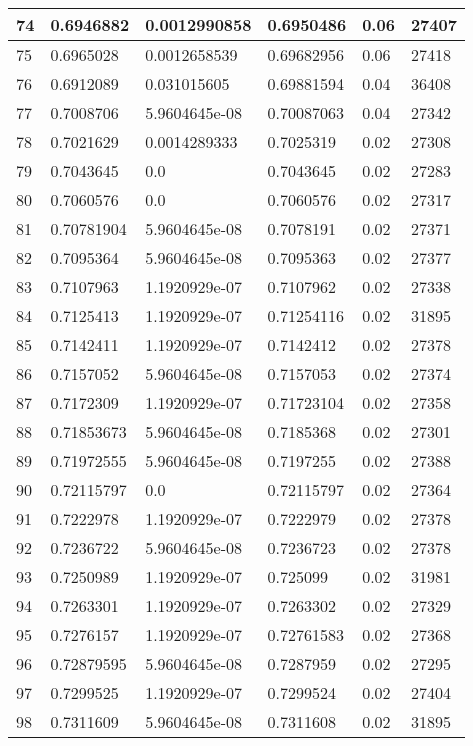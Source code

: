 \begin{longtable}{|l|l|l|l|l|l|}
74 & 0.6946882 & 0.0012990858 & 0.6950486 & 0.06 & 27407 \\ \hline 
75 & 0.6965028 & 0.0012658539 & 0.69682956 & 0.06 & 27418 \\ \hline 
76 & 0.6912089 & 0.031015605 & 0.69881594 & 0.04 & 36408 \\ \hline 
77 & 0.7008706 & 5.9604645e-08 & 0.70087063 & 0.04 & 27342 \\ \hline 
78 & 0.7021629 & 0.0014289333 & 0.7025319 & 0.02 & 27308 \\ \hline 
79 & 0.7043645 & 0.0 & 0.7043645 & 0.02 & 27283 \\ \hline 
80 & 0.7060576 & 0.0 & 0.7060576 & 0.02 & 27317 \\ \hline 
81 & 0.70781904 & 5.9604645e-08 & 0.7078191 & 0.02 & 27371 \\ \hline 
82 & 0.7095364 & 5.9604645e-08 & 0.7095363 & 0.02 & 27377 \\ \hline 
83 & 0.7107963 & 1.1920929e-07 & 0.7107962 & 0.02 & 27338 \\ \hline 
84 & 0.7125413 & 1.1920929e-07 & 0.71254116 & 0.02 & 31895 \\ \hline 
85 & 0.7142411 & 1.1920929e-07 & 0.7142412 & 0.02 & 27378 \\ \hline 
86 & 0.7157052 & 5.9604645e-08 & 0.7157053 & 0.02 & 27374 \\ \hline 
87 & 0.7172309 & 1.1920929e-07 & 0.71723104 & 0.02 & 27358 \\ \hline 
88 & 0.71853673 & 5.9604645e-08 & 0.7185368 & 0.02 & 27301 \\ \hline 
89 & 0.71972555 & 5.9604645e-08 & 0.7197255 & 0.02 & 27388 \\ \hline 
90 & 0.72115797 & 0.0 & 0.72115797 & 0.02 & 27364 \\ \hline 
91 & 0.7222978 & 1.1920929e-07 & 0.7222979 & 0.02 & 27378 \\ \hline 
92 & 0.7236722 & 5.9604645e-08 & 0.7236723 & 0.02 & 27378 \\ \hline 
93 & 0.7250989 & 1.1920929e-07 & 0.725099 & 0.02 & 31981 \\ \hline 
94 & 0.7263301 & 1.1920929e-07 & 0.7263302 & 0.02 & 27329 \\ \hline 
95 & 0.7276157 & 1.1920929e-07 & 0.72761583 & 0.02 & 27368 \\ \hline 
96 & 0.72879595 & 5.9604645e-08 & 0.7287959 & 0.02 & 27295 \\ \hline 
97 & 0.7299525 & 1.1920929e-07 & 0.7299524 & 0.02 & 27404 \\ \hline 
98 & 0.7311609 & 5.9604645e-08 & 0.7311608 & 0.02 & 31895 \\ \hline 

\end{longtable}
